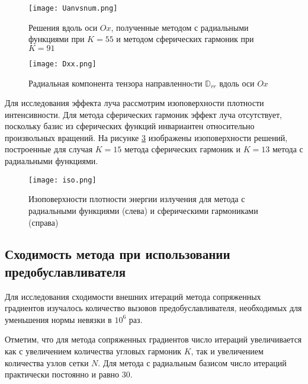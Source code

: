 \begin{figure}[ht!]
\centering
\texttt{[image: Uanvsnum.png]}
\caption{Решения вдоль оси $Ox$, полученные методом с радиальными функциями при $K=55$ и методом сферических гармоник при $K = 91$}
\label{fig:anvsnum}
\end{figure}

\begin{figure}[ht!]
\centering
\texttt{[image: Dxx.png]}
\caption{Радиальная компонента тензора направленноcти $\mathbb D_{rr}$ вдоль оси $Ox$}
\label{fig:Drad}
\end{figure}

Для исследования эффекта луча рассмотрим изоповерхности плотности интенсивности. Для метода сферических гармоник эффект луча отсутствует, поскольку базис из сферических функций инвариантен относительно произвольных вращений. На рисунке \ref{fig:iso} изображены изоповерхности решений, построенные для случая $K = 15$ метода сферических гармоник и $K = 13$ метода с радиальными функциями.

\begin{figure}[ht!]
\centering
\texttt{[image: iso.png]}
\caption{Изоповерхности плотности энергии излучения для метода с радиальными функциями (слева) и сферическими гармониками (справа)}
\label{fig:iso}
\end{figure}

\subsection{Сходимость метода при использовании предобуславливателя}

Для исследования сходимости внешних итераций метода сопряженных градиентов изучалось количество вызовов предобуславливателя, необходимых для уменьшения нормы невязки в $10^{6}$ раз.

Отметим, что для метода сопряженных градиентов число итераций увеличивается как с увеличением количества угловых гармоник $K$, так и увеличением количества узлов сетки $N$. Для метода с радиальным базисом число итераций практически постоянно и равно $30$.


